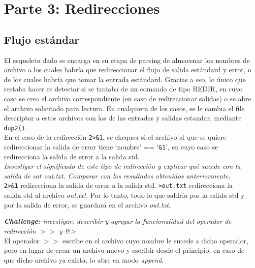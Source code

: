 \documentclass{article}
\begin{document}
\newpage
\section{Parte 3: Redirecciones}
\subsection{Flujo estándar}
El esqueleto dado se encarga en su etapa de parsing de almacenar los nombres de archivo a los cuales habría que redireccionar el flujo de salida estándard y error, o de los cuales habría que tomar la entrada estándard. Gracias a eso, lo único que restaba hacer es detectar si se trataba de un comando de tipo REDIR, en cuyo caso se crea el archivo correspondiente (en caso de redireccionar salidas) o se abre el archivo solicitado para lectura. En cualquiera de los casos, se le cambia el file descriptor a estos archivos con los de las entradas y salidas estandar, mediante \texttt{dup2()}.\\

En el caso de la redirección \texttt{2\textgreater\&1}, se chequea si el archivo al que se quiere redireccionar la salida de error tiene `nombre' == `\texttt{\&1}', en cuyo caso se redirecciona la salida de error a la salida std. \\

\textit{Investigar el significado de este tipo de redirección y explicar qué sucede con la salida de cat out.txt. Comparar con los resultados obtenidos anteriormente.}\\
\texttt{2\textgreater\&1} redirecciona la salida de error a la salida std. \texttt{\textgreater out.txt} redirecciona la salida std al archivo \textit{out.txt}. Por lo tanto, todo lo que saldría por la salida std y por la salida de error, se guardará en el archivo \textit{out.txt}.


\textit{\textbf{Challenge:} investigar, describir y agregar la funcionalidad del operador de redirección $>>$ y \&\textgreater}\\

El operador \texttt{$>>$} escribe en el archivo cuyo nombre le sucede a dicho operador, pero en lugar de crear un archivo nuevo y escribir desde el principio, en caso de que dicho archivo ya exista, lo abre en modo \textit{append}. \\
\end{document}
